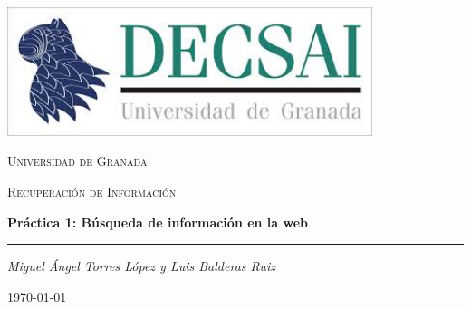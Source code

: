 	
	\begin{titlepage}
		\centering
		\includegraphics[width=0.8\textwidth]{decsai.jpeg}\par\vspace{1cm}
		{\scshape\LARGE Universidad de Granada \par}
		\vspace{1cm}
		{\scshape\Large Recuperaci\'on de Informaci\'on \par}
		\vspace{1.5cm}
		{\huge\bfseries Pr\'actica 1: B\'usqueda de informaci\'on en la web\par}
		\vspace{0.2cm}
		\noindent\rule{\textwidth}{2pt}
		\vspace{2cm}
		{\Large\itshape Miguel \'Angel Torres L\'opez y Luis Balderas Ruiz\par}
		
		\vfill
		
		{\large \today\par}
	\end{titlepage}
	
	\tableofcontents
	
	\newpage
	
